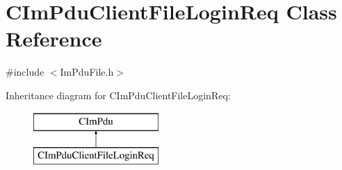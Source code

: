 \hypertarget{class_c_im_pdu_client_file_login_req}{}\section{C\+Im\+Pdu\+Client\+File\+Login\+Req Class Reference}
\label{class_c_im_pdu_client_file_login_req}


{\ttfamily \#include $<$Im\+Pdu\+File.\+h$>$}

Inheritance diagram for C\+Im\+Pdu\+Client\+File\+Login\+Req\+:\begin{figure}[H]
\begin{center}
\leavevmode
\includegraphics[height=2.000000cm]{class_c_im_pdu_client_file_login_req}
\end{center}
\end{figure}
